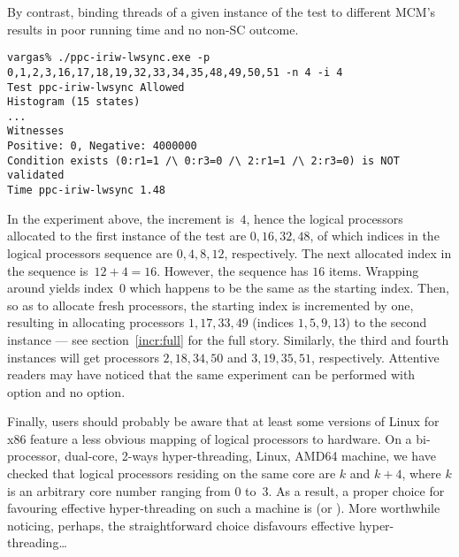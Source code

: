 By contrast, binding threads of a given instance of the test
to different MCM's results in poor running time and no non-SC outcome.
\begin{verbatim}
vargas% ./ppc-iriw-lwsync.exe -p 0,1,2,3,16,17,18,19,32,33,34,35,48,49,50,51 -n 4 -i 4
Test ppc-iriw-lwsync Allowed
Histogram (15 states)
...
Witnesses
Positive: 0, Negative: 4000000
Condition exists (0:r1=1 /\ 0:r3=0 /\ 2:r1=1 /\ 2:r3=0) is NOT validated
Time ppc-iriw-lwsync 1.48
\end{verbatim}
In the experiment above, the increment is~$4$, hence the logical processors
allocated to the first
instance of the test are $0, 16, 32, 48$,
of which indices in the logical processors sequence are $0, 4, 8, 12$,
respectively.
The next allocated index in the sequence is~$12+4 = 16$.
However, the sequence has $16$ items.
Wrapping around yields index~$0$ which happens to be
the same as the starting index.
Then, so as to allocate fresh processors, the starting index is incremented
by one, resulting in allocating processors $1, 17, 33, 49$
(indices $1, 5, 9, 13$) to the second instance --- see section~\ref{incr:full}
for the full story.
Similarly, the third and fourth instances will get processors
$2, 18, 34, 50$ and $3, 19, 35, 51$, respectively.
Attentive readers may have noticed that the same experiment can
be performed with option  and no  option.

Finally, users should probably be aware that at least some versions of Linux
for x86 feature a less obvious mapping of logical processors to hardware.
On a bi-processor, dual-core, 2-ways hyper-threading, Linux,  AMD64 machine,
we have checked that logical processors residing on the same core
are $k$ and $k+4$, where $k$ is an arbitrary core number ranging from
$0$ to~$3$.
As a result, a proper choice for favouring effective hyper-threading
on such a machine is  (or ).
More worthwhile noticing, perhaps,
the straightforward choice  disfavours effective hyper-threading\ldots

